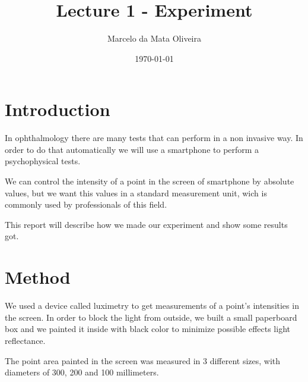 \documentclass[11pt]{article}
\author{Marcelo da Mata Oliveira}
\date{\today}
\title{Lecture 1 - Experiment}
\begin{document}
\maketitle
\tableofcontents


\section{Introduction}
\label{sec-1}
In ophthalmology there are many tests that can perform in a non invasive way. In order to do that automatically we will use a smartphone to perform a psychophysical tests.

We can control the intensity of a point in the screen of smartphone by absolute values, but we want this values in a standard measurement unit, wich is commonly used by professionals of this field.

This report will describe how we made our experiment and show some results got.

\section{Method}
\label{sec-2}
We used a device called luximetry to get measurements of a point's intensities in the screen. In order to block the light from outside, we built a small paperboard box and we painted it inside with black color to minimize possible effects light reflectance.

The point area painted in the screen was measured in 3 different sizes, with diameters of 300, 200 and 100 millimeters.
\end{document}
